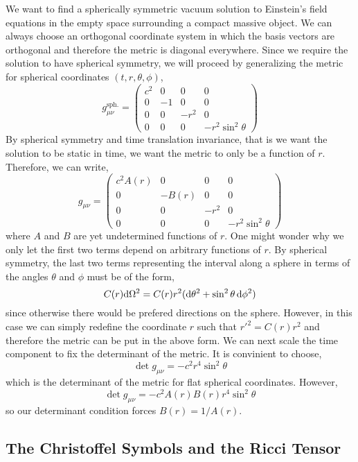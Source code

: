 \documentclass[11pt, a4paper]{article}
\begin{document}
We want to find a spherically symmetric vacuum solution to Einstein's field equations in the empty space surrounding a compact massive object. We can always choose an orthogonal coordinate system in which the basis vectors are orthogonal and therefore the metric is diagonal everywhere. Since we require the solution to have spherical symmetry, we will proceed by generalizing the metric for spherical coordinates $(t, r, \theta, \phi)$,
\[ g^{\mathrm{sph.}}_{\mu \nu}
= 
\begin{pmatrix}
c^2 & 0 & 0 & 0 \\
0 & -1 & 0 & 0 \\
0 & 0 & - r^2 & 0 \\
0 & 0 & 0 & - r^2 \sin^2{\theta}
\end{pmatrix}
\]
By spherical symmetry and time translation invariance, that is we want the solution to be static in time, we want the metric to only be a function of $r$. Therefore, we can write,
\[ g_{\mu \nu}
= 
\begin{pmatrix}
c^2 A(r) & 0 & 0 & 0 \\
0 & -B(r) & 0 & 0 \\
0 & 0 & - r^2 & 0 \\
0 & 0 & 0 & - r^2 \sin^2{\theta}
\end{pmatrix}
\]
where $A$ and $B$ are yet undetermined functions of $r$. One might wonder why we only let the first two terms depend on arbitrary functions of $r$. By spherical symmetry, the last two terms representing the interval along a sphere in terms of the angles $\theta$ and $\phi$ must be of the form, 
\[C(r) \mathrm{d}\Omega^2 = C(r) r^2 ( \mathrm{d}\theta^2 + \sin^2{\theta} \, \mathrm{d}\phi^2)\] 
since otherwise there would be prefered directions on the sphere. However, in this case we can simply redefine the coordinate $r$ such that $r'^2 = C(r) r^2$ and therefore the metric can be put in the above form. We can next scale the time component to fix the determinant of the metric. It is convinient to choose,
\[ \det{g_{\mu \nu}} = - c^2 r^4 \sin^2{\theta} \]
which is the determinant of the metric for flat spherical coordinates. However,
\[ \det{g_{\mu \nu}} = - c^2 A(r) B(r) r^4 \sin^2{\theta} \]
so our determinant condition forces $B(r) = 1/A(r)$. 

\subsection{The Christoffel Symbols and the Ricci Tensor}
\end{document}
